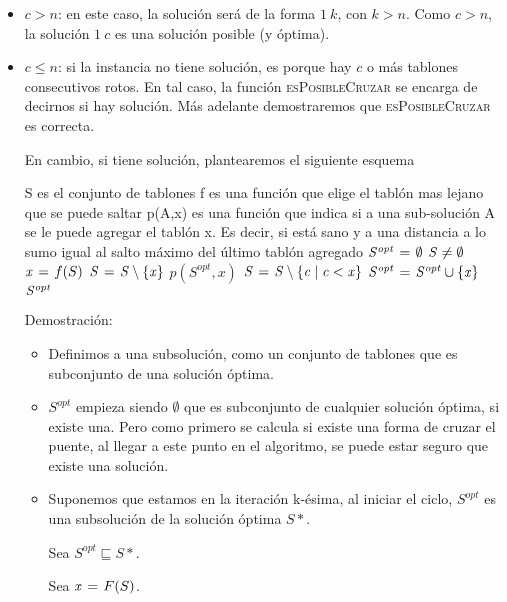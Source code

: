 \begin{itemize}
  \item $c > n$: en este caso, la solución será de la forma $1 \ k$, con $k > n$. Como $c > n$, la
  solución $1 \ c$ es una solución posible (y óptima).

  \item $c \leq n$: si la instancia no tiene solución, es porque hay $c$ o más tablones
  consecutivos rotos. En tal caso, la función \textsc{esPosibleCruzar} se encarga de
  decirnos si hay solución. Más adelante demostraremos que \textsc{esPosibleCruzar}
  es correcta. \medskip

  En cambio, si tiene solución, plantearemos el siguiente esquema

  \begin{codebox}
  \li \Comment S es el conjunto de tablones
  \li \Comment f es una función que elige el tablón mas lejano que se puede saltar
  \li \Comment p(A,x) es una función que indica si a una sub-solución A se le
  \li \Comment   puede agregar el tablón x. Es decir, si está sano y a una distancia
  \li \Comment   a lo sumo igual al salto máximo del último tablón agregado
  \li $\id{S^{opt}} \gets \emptyset$
  \li \While $\id{S} \neq \emptyset$
  \li     \Do
    			$\id{x} \gets f(S)$
  \li  			$\id{S} \gets \id{S} \setminus \{\id{x}\}$
  \li			\If $p(S^{opt}, x)$
    				\Then
  \li					$\id{S} \gets \id{S} \setminus \{\id{c} \mid \id{c} < \id{x}\}$
  \li					$\id{S^{opt}} \gets \id{S^{opt}} \cup \{\id{x}\}$
    				\End
    		\End
  \li \Return $\id{S^{opt}}$
  \end{codebox}

  Demostración:
  \begin{itemize}
    \item Definimos a una subsolución, como un conjunto de tablones que
    es subconjunto de una solución óptima.
    \item $S^{opt}$ empieza siendo $\emptyset$ que es subconjunto de cualquier
    solución óptima, si existe una. Pero como primero se calcula si
    existe una forma de cruzar el puente, al llegar a este punto en el
    algoritmo, se puede estar seguro que existe una solución.
    \item Suponemos que estamos en la iteración k-ésima, al iniciar
    el ciclo, $S^{opt}$ es una subsolución de la solución óptima $S*$.
    
    Sea $S^{opt} \sqsubseteq S*$.
    
    Sea $\id{x} \gets F(S)$.
    

\end{itemize}
\end{itemize}
